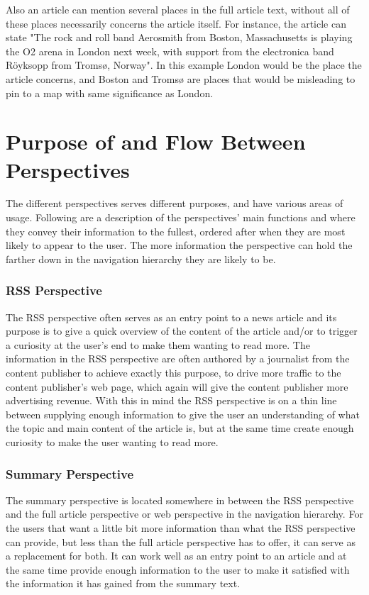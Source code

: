 Also an article can mention several places in the full article text, without all of these places necessarily concerns the article itself. For instance, the article can state "The rock and roll band Aerosmith from Boston, Massachusetts is playing the O2 arena in London next week, with support from the electronica band Röyksopp from Tromsø, Norway". In this example London would be the place the article concerns, and Boston and Tromsø are places that would be misleading to pin to a map with same significance as London.


\section{Purpose of and Flow Between Perspectives}
The different perspectives serves different purposes, and have various areas of usage. Following are a description of the perspectives' main functions and where they convey their information to the fullest, ordered after when they are most likely to appear to the user. The more information the perspective can hold the farther down in the navigation hierarchy they are likely to be.


\subsubsection{RSS Perspective}
The RSS perspective often serves as an entry point to a news article and its purpose is to give a quick overview of the content of the article and/or to trigger a curiosity at the user's end to make them wanting to read more. The information in the RSS perspective are often authored by a journalist from the content publisher to achieve exactly this purpose, to drive more traffic to the content publisher's web page, which again will give the content publisher more advertising revenue. With this in mind the RSS perspective is on a thin line between supplying enough information to give the user an understanding of what the topic and main content of the article is, but at the same time create enough curiosity to make the user wanting to read more.

\subsubsection{Summary Perspective}
The summary perspective is located somewhere in between the RSS perspective and the full article perspective or web perspective in the navigation hierarchy. For the users that want a little bit more information than what the RSS perspective can provide, but less than the full article perspective has to offer, it can serve as a replacement for both. It can work well as an entry point to an article and at the same time provide enough information to the user to make it satisfied with the information it has gained from the summary text. 

